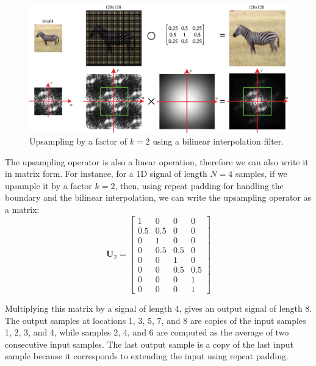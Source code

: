 \begin{figure}[t]
\includegraphics[width=1\linewidth]{figures/upsamplig_downsampling/upsampling_bilinear.eps}
\caption{Upsampling by a factor of $k=2$ using a bilinear interpolation filter.} 
\label{fig:upsamplingazebra}
\end{figure}



The upsampling operator is also a linear operation, therefore we can also write it in matrix form. For instance, for a 1D signal of length $N=4$  samples, if we upsample it by a factor $k=2$, then, using repeat padding for handling the boundary and the bilinear interpolation, we can write the upsampling operator as a matrix:
\begin{equation}
\mathbf{U}_2 = \left[ 
\begin{array}{cccc}
1    & 0    & 0  & 0\\
0.5  & 0.5  & 0  & 0\\
0    & 1    & 0  & 0\\
0    & 0.5 & 0.5 & 0\\
0    & 0    & 1  & 0\\
0    & 0    & 0.5& 0.5\\
0    & 0    & 0  & 1\\
0    & 0    & 0  & 1
\end{array}
\right]
\end{equation}

Multiplying this matrix by a signal of length 4, gives an output signal of length 8. The output samples at locations 1, 3, 5, 7, and 8 are copies of the input samples 1, 2, 3, and 4, while samples 2, 4, and 6 are computed as the average of two consecutive input samples. The last output sample is a copy of the last input sample because it corresponds to extending the input using repeat padding.



